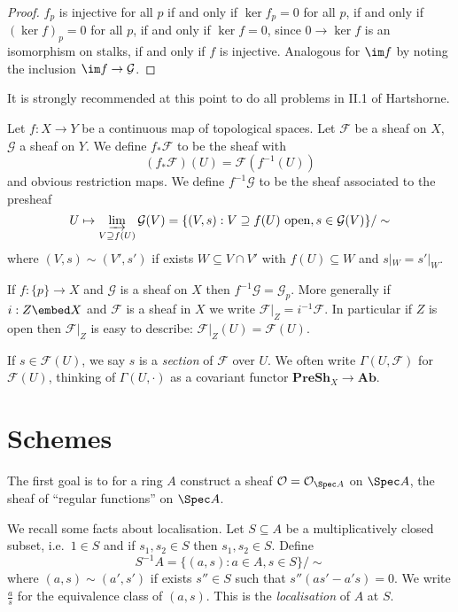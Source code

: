 \documentclass[a4paper]{article}
\renewcommand{\c}[1]{\mathbf{#1}} %
\newcommand{\sh}[1]{\mathcal{#1}} %
\begin{document}
\begin{proof}
  \(f_p\) is injective for all \(p\) if and only if \(\ker f_p = 0\) for all \(p\), if and only if \((\ker f)_p = 0\) for all \(p\), if and only if \(\ker f = 0\), since \(0 \to \ker f\) is an isomorphism on stalks, if and only if \(f\) is injective. Analogous for \(\im f\) by noting the inclusion \(\im f \to \sh G\).
\end{proof}

It is strongly recommended at this point to do all problems in II.1 of Hartshorne.

\begin{definition}
  Let \(f: X \to Y\) be a continuous map of topological spaces. Let \(\sh F\) be a sheaf on \(X\), \(\sh G\) a sheaf on \(Y\). We define \(f_* \sh F\) to be the sheaf with
  \[
    (f_* \sh F)(U) = \sh F (f^{-1}(U))
  \]
  and obvious restriction maps. We define \(f^{-1} \sh G\) to be the sheaf associated to the presheaf
  \[
    U \mapsto \varinjlim_{V \supseteq f(U)} \sh G(V) = \{(V, s): V \supseteq f(U) \text{ open}, s \in \sh G(V)\}/ \sim
  \]
  where \((V, s) \sim (V', s')\) if exists \(W \subseteq V \cap V'\) with \(f(U) \subseteq W\) and \(s|_W = s'|_W\).
\end{definition}

\begin{eg}
  If \(f: \{p\} \to X\) and \(\sh G\) is a sheaf on \(X\) then \(f^{-1} \sh G = \sh G_p\). More generally if \(i: Z \embed X\) and \(\sh F\) is a sheaf in \(X\) we write \(\sh F|_Z = i^{-1} \sh F\). In particular if \(Z\) is open then \(\sh F|_Z\) is easy to describe: \(\sh F|_Z(U) = \sh F(U)\).
\end{eg}

\begin{notation}
  If \(s \in \sh F(U)\), we say \(s\) is a \emph{section} of \(\sh F\) over \(U\). We often write \(\Gamma(U, \sh F)\) for \(\sh F(U)\), thinking of \(\Gamma(U, \cdot)\) as a covariant functor \(\c{PreSh}_X \to \c{Ab}\).
\end{notation}

\section{Schemes}

The first goal is to for a ring \(A\) construct a sheaf \(\sh O = \mathcal O_{\Spec A}\) on \(\Spec A\), the sheaf of ``regular functions'' on \(\Spec A\).

We recall some facts about localisation. Let \(S \subseteq A\) be a multiplicatively closed subset, i.e.\ \(1 \in S\) and if \(s_1, s_2 \in S\) then \(s_1, s_2 \in S\). Define
\[
  S^{-1}A = \{(a, s): a \in A, s \in S\}/\sim
\]
where \((a, s) \sim (a', s')\) if exists \(s'' \in S\) such that \(s''(as' - a's) = 0\). We write \(\frac{a}{s}\) for the equivalence class of \((a, s)\). This is the \emph{localisation} of \(A\) at \(S\).
\end{document}
